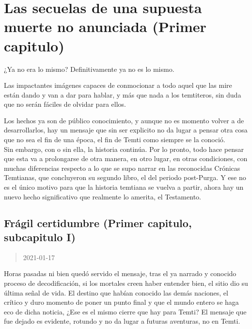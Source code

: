 \documentclass[
  spanish,
]{book}
\begin{document}
\hypertarget{las-secuelas-de-una-supuesta-muerte-no-anunciada-primer-capitulo}{%
\chapter{Las secuelas de una supuesta muerte no anunciada (Primer capitulo)}\label{las-secuelas-de-una-supuesta-muerte-no-anunciada-primer-capitulo}}

¿Ya no era lo mismo? Definitivamente ya no es lo mismo.

Las impactantes imágenes capaces de conmocionar a todo aquel que las mire están dando y van a dar para hablar, y más que nada a los temtiteros, sin duda que no serán fáciles de olvidar para ellos.

Los hechos ya son de público conocimiento, y aunque no es momento volver a de desarrollarlos, hay un mensaje que sin ser explicito no da lugar a pensar otra cosa que no sea el fin de una época, el fin de Temti como siempre se la conoció.\\
Sin embargo, con o sin ella, la historia continúa. Por lo pronto, todo hace pensar que esta va a prolongarse de otra manera, en otro lugar, en otras condiciones, con muchas diferencias respecto a lo que se supo narrar en las reconocidas Crónicas Temtianas, que concluyeron su segundo libro, el del periodo post-Purga. Y ese no es el único motivo para que la historia temtiana se vuelva a partir, ahora hay un nuevo hecho significativo que realmente lo amerita, el Testamento.

\hypertarget{fruxe1gil-certidumbre-primer-capitulo-subcapitulo-i}{%
\section{Frágil certidumbre (Primer capitulo, subcapitulo I)}\label{fruxe1gil-certidumbre-primer-capitulo-subcapitulo-i}}

\begin{quote}
2021-01-17
\end{quote}

Horas pasadas ni bien quedó servido el mensaje, tras el ya narrado y conocido proceso de decodificación, si los mortales creen haber entender bien, el sitio dio su última señal de vida.
El destino que habían conocido las demás naciones, el crítico y duro momento de poner un punto final y que el mundo entero se haga eco de dicha noticia, ¿Ese es el mismo cierre que hay para Temti?
El mensaje que fue dejado es evidente, rotundo y no da lugar a futuras aventuras, no en Temti.
\end{document}
